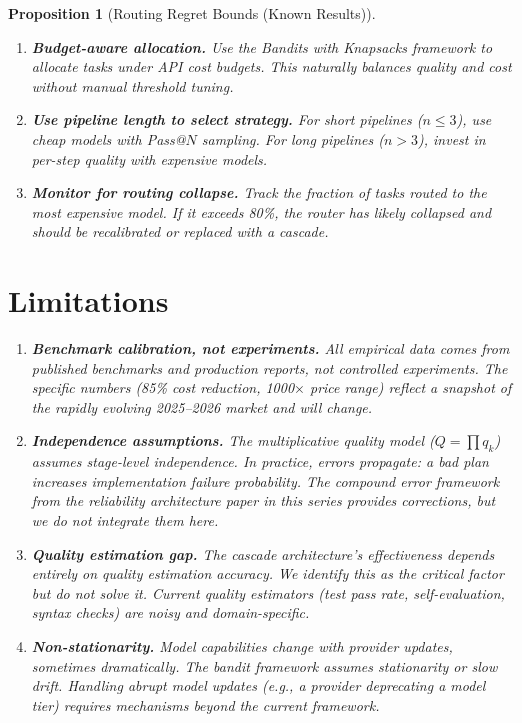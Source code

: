 \documentclass[11pt, a4paper, logo, copyright]{googledeepmind}
\newtheorem{proposition}{Proposition}[section]
\begin{document}
\begin{proposition}[Routing Regret Bounds (Known Results)]
\begin{enumerate}
\item \textbf{Budget-aware allocation.} Use the Bandits with Knapsacks framework to allocate tasks under API cost budgets. This naturally balances quality and cost without manual threshold tuning.

\item \textbf{Use pipeline length to select strategy.} For short pipelines ($n \leq 3$), use cheap models with Pass@$N$ sampling. For long pipelines ($n > 3$), invest in per-step quality with expensive models.

\item \textbf{Monitor for routing collapse.} Track the fraction of tasks routed to the most expensive model. If it exceeds 80\%, the router has likely collapsed and should be recalibrated or replaced with a cascade.
\end{enumerate}


\section{Limitations}
\label{sec:limitations}

\begin{enumerate}
\item \textbf{Benchmark calibration, not experiments.} All empirical data comes from published benchmarks and production reports, not controlled experiments. The specific numbers (85\% cost reduction, 1000$\times$ price range) reflect a snapshot of the rapidly evolving 2025--2026 market and will change.

\item \textbf{Independence assumptions.} The multiplicative quality model ($Q = \prod q_k$) assumes stage-level independence. In practice, errors propagate: a bad plan increases implementation failure probability. The compound error framework from the reliability architecture paper in this series provides corrections, but we do not integrate them here.

\item \textbf{Quality estimation gap.} The cascade architecture's effectiveness depends entirely on quality estimation accuracy. We identify this as the critical factor but do not solve it. Current quality estimators (test pass rate, self-evaluation, syntax checks) are noisy and domain-specific.

\item \textbf{Non-stationarity.} Model capabilities change with provider updates, sometimes dramatically. The bandit framework assumes stationarity or slow drift. Handling abrupt model updates (e.g., a provider deprecating a model tier) requires mechanisms beyond the current framework.


\end{enumerate}
\end{proposition}
\end{document}
